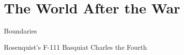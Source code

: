 


\section{The World After the War}
\begin{frame}{Boundaries}

\end{frame}

Rosenquist's F-111
Basquiat Charles the Fourth
